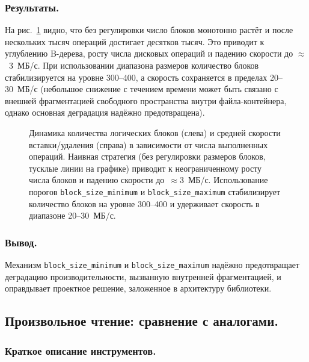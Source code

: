 \subsubsection{Результаты.}
На рис.~\ref{fig:fragmentation} видно, что без регулировки число блоков монотонно растёт и после нескольких тысяч операций достигает десятков тысяч. Это приводит к углублению B-дерева, росту числа дисковых операций и падению скорости до $\approx$~3~МБ/с. При использовании диапазона размеров количество блоков стабилизируется на уровне 300--400, а скорость сохраняется в пределах 20--30~МБ/с (небольшое снижение с течением времени может быть связано с внешней фрагментацией свободного пространства внутри файла-контейнера, однако основная деградация надёжно предотвращена).

\begin{figure}[h]
    \centering
    
    \caption{Динамика количества логических блоков (слева) и средней скорости вставки/удаления (справа) в зависимости от числа выполненных операций. Наивная стратегия (без регулировки размеров блоков, тусклые линии на графике) приводит к неограниченному росту числа блоков и падению скорости до~$\approx$3~МБ/с. Использование порогов \texttt{block\_size\_minimum} и \texttt{block\_size\_maximum} стабилизирует количество блоков на уровне 300--400 и удерживает скорость в диапазоне 20--30~МБ/с.}
    \label{fig:fragmentation}
\end{figure}

\subsubsection{Вывод.}
Механизм \texttt{block\_size\_minimum} и \texttt{block\_size\_maximum} надёжно предотвращает деградацию производительности, вызванную внутренней фрагментацией, и оправдывает проектное решение, заложенное в архитектуру библиотеки.

\subsection{Произвольное чтение: сравнение с аналогами.}

\subsubsection{Краткое описание инструментов.}

